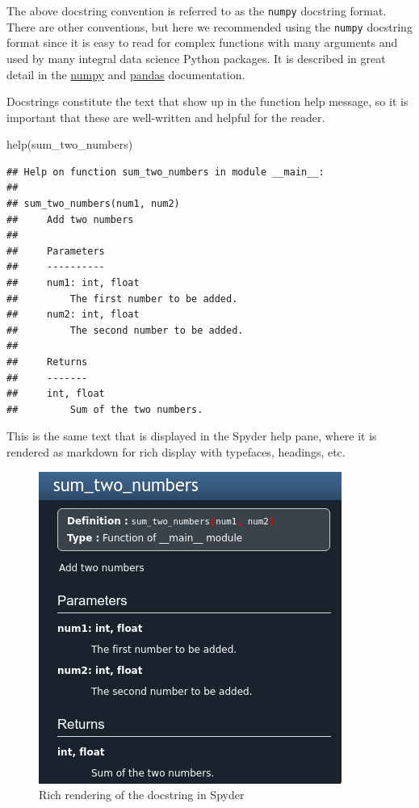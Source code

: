 \documentclass[]{Nemilov}
\newenvironment{Shaded}{\begin{snugshade}}{\end{snugshade}}
\newcommand{\BuiltInTok}[1]{#1}
\newcommand{\NormalTok}[1]{#1}
\begin{document}
The above docstring convention is referred to as the \texttt{numpy} docstring format.
There are other conventions, but here we recommended using the \texttt{numpy}
docstring format since it is easy to read for complex functions with many
arguments and used by many integral data science Python packages. It is
described in great detail in the \href{https://numpydoc.readthedocs.io/en/latest/format.html}{numpy} and
\href{https://pandas.pydata.org/pandas-docs/stable/development/contributing_docstring.html}{pandas} documentation.

Docstrings constitute the text that show up in the function help message, so
it is important that these are well-written and helpful for the reader.

\begin{Shaded}
\begin{Highlighting}[]
\BuiltInTok{help}\NormalTok{(sum_two_numbers)}
\end{Highlighting}
\end{Shaded}

\begin{verbatim}
## Help on function sum_two_numbers in module __main__:
## 
## sum_two_numbers(num1, num2)
##     Add two numbers
##     
##     Parameters
##     ----------
##     num1: int, float
##         The first number to be added.
##     num2: int, float
##         The second number to be added.
##     
##     Returns
##     -------
##     int, float
##         Sum of the two numbers.
\end{verbatim}

This is the same text that is displayed in the Spyder help pane, where it is
rendered as markdown for rich display with typefaces, headings, etc.

\begin{figure}
\centering
\includegraphics{figures/py-development/docstring-spyder.png}
\caption{Rich rendering of the docstring in Spyder}
\end{figure}
\end{document}
